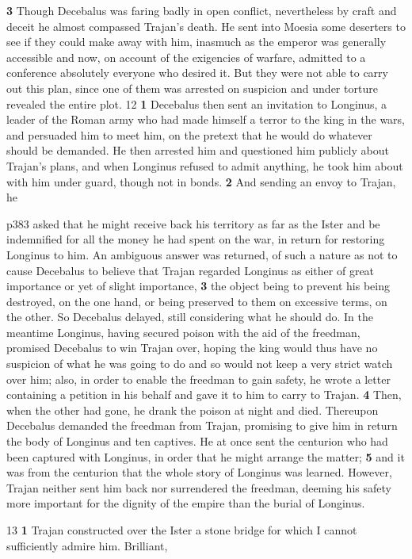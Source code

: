 \textbf{3} Though Decebalus was faring badly in open conflict, nevertheless by craft and deceit he almost compassed Trajan's death. He sent into Moesia some deserters to see if they could make away with him, inasmuch as the emperor was generally accessible and now, on account of the exigencies of warfare, admitted to a conference absolutely everyone who desired it. But they were not able to carry out this plan, since one of them was arrested on suspicion and under torture revealed the entire plot.
12
\textbf{1} Decebalus then sent an invitation to Longinus, a leader of the Roman army who had made himself a terror to the king in the wars, and persuaded him to meet him, on the pretext that he would do whatever should be demanded. He then arrested him and questioned him publicly about Trajan's plans, and when Longinus refused to admit anything, he took him about with him under guard, though not in bonds. \textbf{2} And sending an envoy to Trajan, he

p383 asked that he might receive back his territory as far as the Ister and be indemnified for all the money he had spent on the war, in return for restoring Longinus to him. An ambiguous answer was returned, of such a nature as not to cause Decebalus to believe that Trajan regarded Longinus as either of great importance or yet of slight importance, \textbf{3} the object being to prevent his being destroyed, on the one hand, or being preserved to them on excessive terms, on the other. So Decebalus delayed, still considering what he should do. In the meantime Longinus, having secured poison with the aid of the freedman, promised Decebalus to win Trajan over, hoping the king would thus have no suspicion of what he was going to do and so would not keep a very strict watch over him; also, in order to enable the freedman to gain safety, he wrote a letter containing a petition in his behalf and gave it to him to carry to Trajan. \textbf{4} Then, when the other had gone, he drank the poison at night and died. Thereupon Decebalus demanded the freedman from Trajan, promising to give him in return the body of Longinus and ten captives. He at once sent the centurion who had been captured with Longinus, in order that he might arrange the matter; \textbf{5} and it was from the centurion that the whole story of Longinus was learned. However, Trajan neither sent him back nor surrendered the freedman, deeming his safety more important for the dignity of the empire than the burial of Longinus.

13
\textbf{1} Trajan constructed over the Ister a stone bridge for which I cannot sufficiently admire him. Brilliant,

